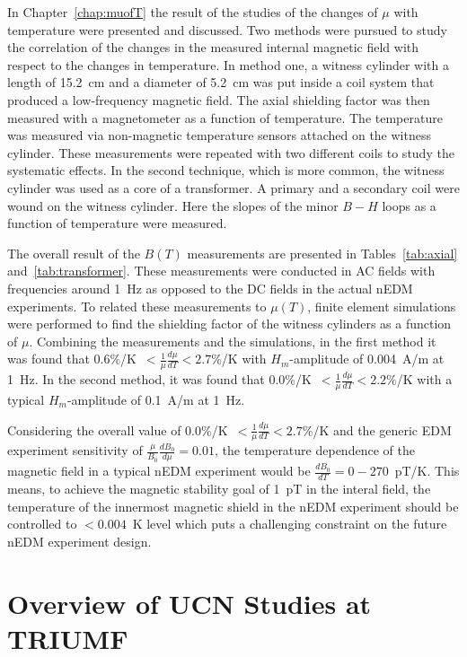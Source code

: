 In Chapter~\ref{chap:muofT} the result of the studies of the changes
of $\mu$ with temperature were presented and discussed. Two methods
were pursued to study the correlation of the changes in the measured
internal magnetic field with respect to the changes in temperature. In
method one, a witness cylinder with a length of 15.2~cm and a diameter
of 5.2~cm was put inside a coil system that produced a low-frequency
magnetic field. The axial shielding factor was then measured with a
magnetometer as a function of temperature. The temperature was
measured via non-magnetic temperature sensors attached on the witness
cylinder. These measurements were repeated with two different coils to
study the systematic effects. In the second technique, which is more
common, the witness cylinder was used as a core of a transformer. A
primary and a secondary coil were wound on the witness cylinder. Here
the slopes of the minor $B-H$ loops as a function of temperature were
measured.

The overall result of the $B(T)$ measurements are presented in
Tables~\ref{tab:axial} and~\ref{tab:transformer}. These measurements
were conducted in AC fields with frequencies around 1~Hz as opposed to
the DC fields in the actual nEDM experiments. To related these
measurements to $\mu(T)$, finite element simulations were performed to
find the shielding factor of the witness cylinders as a function of
$\mu$. Combining the measurements and the simulations, in the first
method it was found that
0.6\%/K~$<\frac{1}{\mu}\frac{d\mu}{dT}<2.7\%$/K with $H_m$-amplitude
of 0.004~A/m at 1~Hz. In the second method, it was found that
0.0\%/K~$<\frac{1}{\mu}\frac{d\mu}{dT}<2.2\%$/K with a typical
$H_m$-amplitude of 0.1~A/m at 1~Hz.

Considering the overall value of
0.0\%/K~$<\frac{1}{\mu}\frac{d\mu}{dT}<2.7$\%/K and the generic EDM
experiment sensitivity of $\frac{\mu}{B_0}\frac{dB_0}{d\mu}=0.01$, the
temperature dependence of the magnetic field in a typical nEDM
experiment would be $\frac{dB_0}{dT}=0-270$~pT/K. This means, to
achieve the magnetic stability goal of 1~pT in the interal field, the
temperature of the innermost magnetic shield in the nEDM experiment
should be controlled to $<0.004$~K level which puts a challenging
constraint on the future nEDM experiment design.

\section{Overview of UCN Studies at TRIUMF}

